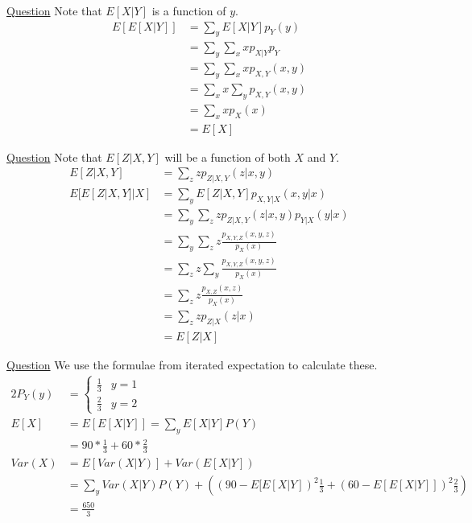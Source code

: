 \documentclass[11pt, a4paper]{article}
\begin{document}
\begin{enumerate}
        \hypertarget{a_itrexpproof}{\item} \hyperlink{q_itrexpproof}{Question} \newline
        Note that $E[X|Y]$ is a function of $y$.
        \begin{align*}
            E[E[X|Y]] &= \sum_{y} E[X|Y] p_Y(y)\\
                     &= \sum_{y} \sum_{x} xp_{X|Y}p_{Y}\\
                     &= \sum_{y}\sum_{x} xp_{X,Y}(x,y)\\
                     &= \sum_{x}x\sum_{y}p_{X,Y}(x,y)\\
                     &= \sum_{x} x p_{X}(x)\\
                     &= E[X]
        \end{align*}


        \hypertarget{a_itrexpthree}{\item} \hyperlink{q_itrexpthree}{Question} \newline
        Note that $E[Z|X,Y]$ will be a function of both $X$ and $Y$.
        \begin{align*}
            E[Z|X,Y] &= \sum_{z} z p_{Z|X,Y}(z|x,y)\\
            E[E[Z|X,Y]|X] &= \sum_{y} E[Z|X,Y]p_{X,Y|X}(x,y|x)\\
                        &= \sum_{y} \sum_{z} z p_{Z|X,Y}(z|x,y) p_{Y|X}(y|x)\\
                        &= \sum_{y} \sum_{z} z \frac{p_{X,Y,Z}(x,y,z)}{p_{X}(x)}\\
                        &= \sum_{z} z \sum_{y} \frac{p_{X,Y,Z}(x,y,z)}{p_{X}(x)}\\
                        &= \sum_{z} z \frac{p_{X,Z}(x,z)}{p_{X}(x)}\\
                        &= \sum_{z} z p_{Z|X}(z|x)\\
                        &= E[Z|X]
        \end{align*}

    
        \hypertarget{a_itrexppractice}{\item} \hyperlink{q_itrexppractice}{Question}\newline
        We use the formulae from iterated expectation to calculate these.
        \begin{alignat*}{2}
            P_{Y}(y) &= \begin{cases} \frac{1}{3} &y = 1\\
                                    \frac{2}{3} &y = 2 \end{cases}\\
            E[X] &= E[E[X|Y]] = \sum_{y}E[X|Y]P(Y)\\
                &= 90 * \frac{1}{3} + 60 * \frac{2}{3}\\
            Var(X) &= E[Var(X|Y)] + Var(E[X|Y])\\
                  &= \sum_{y}Var(X|Y)P(Y) + ((90-E[E[X|Y])^{2}\frac{1}{3} + (60-E[E[X|Y]])^{2}\frac{2}{3})\\
                  &= \frac{650}{3}
        \end{alignat*}
        

\end{enumerate}
\end{document}
